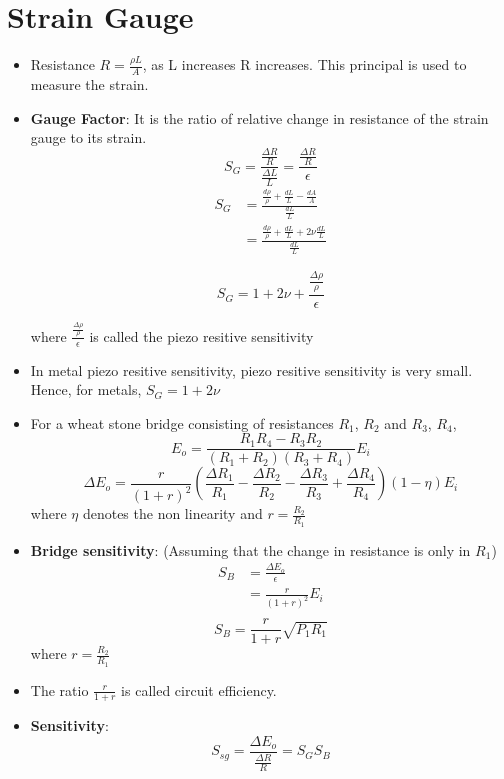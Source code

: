 \documentclass{article}
\begin{document}
\section{Strain Gauge}
	\begin{itemize}
		\item Resistance $R = \frac{\rho L}{A}$, as L increases R increases. This principal is used to measure the strain. 
		\item \textbf{Gauge Factor}: It is the ratio of relative change in resistance of the strain gauge to its strain. 
			\[S_G = \frac{\frac{\Delta R}{R}}{\frac{\Delta L}{L}} = \frac{\frac{\Delta R}{R}}{\epsilon}\]
			\begin{align*}
				S_G &= \frac{\frac{d\rho}{\rho} + \frac{dL}{L} - \frac{dA}{A}}{\frac{dL}{L}}\\
				   &= \frac{\frac{d\rho}{\rho} + \frac{dL}{L} + 2 \nu \frac{dL}{L}}{\frac{dL}{L}}
			\end{align*}

			\[\boxed{S_G = 1+ 2\nu +\frac{\frac{\Delta \rho}{\rho}}{\epsilon}}\]

			where $\frac{\frac{\Delta \rho}{\rho}}{\epsilon}$ is called the piezo resitive sensitivity

		\item In metal piezo resitive sensitivity, piezo resitive sensitivity is very small. Hence, for metals, $S_G = 1+2\nu$

		\item For a wheat stone bridge consisting of resistances $R_1$, $R_2$ and $R_3$, $R_4$, 
		\[E_o = \frac{R_1 R_4 - R_3 R_2}{(R_1 + R_2)(R_3+R_4)}E_i\]
		\[{\Delta E_o} = \frac{r}{(1+r)^2} \left( \frac{\Delta R_1}{R_1} - \frac{\Delta R_2}{R_2} - \frac{\Delta R_3}{R_3} + \frac{\Delta R_4}{R_4} \right ) (1-\eta) E_i\]
		where $\eta$ denotes the non linearity and $r=\frac{R_2}{R_1}$

		\item \textbf{Bridge sensitivity}: 
		(Assuming that the change in resistance is only in $R_1$)
		\begin{align*}
			S_B &= \frac{\Delta E_o}{\epsilon}\\
				&= \frac{r}{(1+r)^2}E_i\\
		\end{align*}
		\[\boxed{S_B = \frac{r}{1+r} \sqrt{P_1R_1}}\]
		where $r=\frac{R_2}{R_1}$

		\item The ratio $\frac{r}{1+r}$ is called circuit efficiency.

		\item \textbf{Sensitivity}:
		\[S_{sg} = \frac{\Delta E_o}{\frac{\Delta R}{R}} = S_G S_B\]
	\end{itemize}
\end{document}
